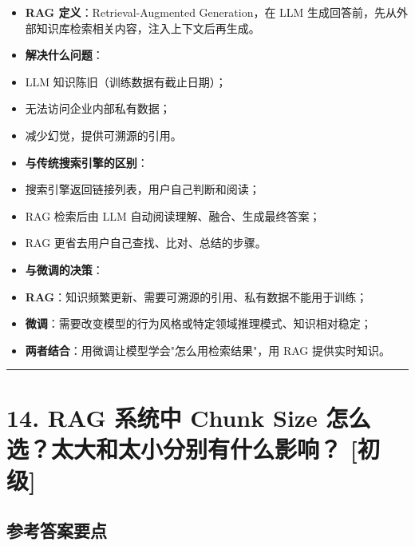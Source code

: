 \documentclass[9pt,a4paper,twocolumn]{ctexart}
\newcommand{\lvchu}{\usebox{\badgechubox}}
\def\lvchu{[初级]}%
\begin{document}
\begin{itemize}[itemsep=1pt, topsep=2pt]
  \item \textbf{RAG 定义}：Retrieval-Augmented Generation，在 LLM 生成回答前，先从外部知识库检索相关内容，注入上下文后再生成。
  \item \textbf{解决什么问题}：
  \item LLM 知识陈旧（训练数据有截止日期）；
  \item 无法访问企业内部私有数据；
  \item 减少幻觉，提供可溯源的引用。
  \item \textbf{与传统搜索引擎的区别}：
  \item 搜索引擎返回链接列表，用户自己判断和阅读；
  \item RAG 检索后由 LLM 自动阅读理解、融合、生成最终答案；
  \item RAG 更省去用户自己查找、比对、总结的步骤。
  \item \textbf{与微调的决策}：
  \item \textbf{RAG}：知识频繁更新、需要可溯源的引用、私有数据不能用于训练；
  \item \textbf{微调}：需要改变模型的行为风格或特定领域推理模式、知识相对稳定；
  \item \textbf{两者结合}：用微调让模型学会"怎么用检索结果"，用 RAG 提供实时知识。
\end{itemize}


\vspace{2pt}
\noindent\rule{\columnwidth}{0.3pt}\vspace{2pt}



\section*{14. RAG 系统中 Chunk Size 怎么选？太大和太小分别有什么影响？ \lvchu{}}


\subsection*{参考答案要点}
\end{document}
